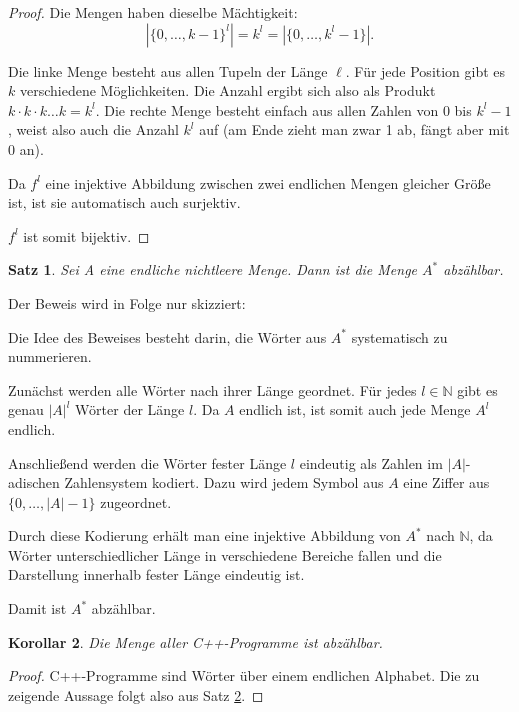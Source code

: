 \documentclass{article}
\newcommand{\N}{\mathbb{N}}%
\newtheorem{thm}{Satz}
\newtheorem{cor}[thm]{Korollar}
\begin{document}
\begin{proof}
Die Mengen haben dieselbe Mächtigkeit:
\[
|\{0,\dots,k-1\}^l| = k^l = |\{0,\dots,k^l-1\}|.
\]

Die linke Menge besteht aus allen Tupeln der Länge $\ell$. Für jede Position gibt es $k$ verschiedene Möglichkeiten. Die Anzahl ergibt sich also als Produkt $k\cdot k\cdot k \dots k = k^l$. Die rechte Menge besteht einfach aus allen Zahlen von 0 bis $k^l-1$, weist also auch die Anzahl $k^l$ auf (am Ende zieht man zwar 1 ab, fängt aber mit 0 an).


Da $f^l$ eine injektive Abbildung zwischen zwei endlichen Mengen gleicher Größe ist, ist sie automatisch auch surjektiv.

\vspace{0.5em}

$f^l$ ist somit bijektiv.
\end{proof}


\begin{thm}
    Sei A eine endliche nichtleere Menge. Dann ist die Menge $A^*$ abzählbar.
\end{thm}

Der Beweis wird in Folge nur skizziert:

Die Idee des Beweises besteht darin, die Wörter aus $A^*$ systematisch zu nummerieren.

Zunächst werden alle Wörter nach ihrer Länge geordnet. Für jedes $l \in \N$ gibt es genau $|A|^l$ Wörter der Länge $l$. Da $A$ endlich ist, ist somit auch jede Menge $A^l$ endlich.

Anschließend werden die Wörter fester Länge $l$ eindeutig als Zahlen im $|A|$-adischen Zahlensystem kodiert. Dazu wird jedem Symbol aus $A$ eine Ziffer aus $\{0,\dots,|A|-1\}$ zugeordnet.

Durch diese Kodierung erhält man eine injektive Abbildung von $A^*$ nach $\N$, da Wörter unterschiedlicher Länge in verschiedene Bereiche fallen und die Darstellung innerhalb fester Länge eindeutig ist.

Damit ist $A^*$ abzählbar.



\begin{cor}
\label{abzählbar}
    Die Menge aller C++-Programme ist abzählbar.
\end{cor}

\begin{proof}
 
    C++-Programme sind Wörter über einem endlichen Alphabet. Die zu zeigende Aussage folgt also aus Satz \ref{abzählbar}.
   
\end{proof}
\end{document}

